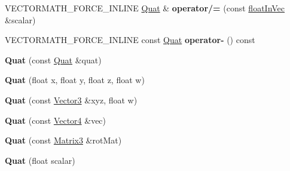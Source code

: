 \begin{DoxyCompactItemize}
\item 
\mbox{\label{classVectormath_1_1Aos_1_1Quat_aaafed68d1c51db881ed54fa3ac349767}} 
V\+E\+C\+T\+O\+R\+M\+A\+T\+H\+\_\+\+F\+O\+R\+C\+E\+\_\+\+I\+N\+L\+I\+NE \hyperlink{classVectormath_1_1Aos_1_1Quat}{Quat} \& {\bfseries operator/=} (const \hyperlink{classVectormath_1_1floatInVec}{float\+In\+Vec} \&scalar)
\item 
\mbox{\label{classVectormath_1_1Aos_1_1Quat_a6fd9ec8cbfe3cb15d6139da9b5dd1913}} 
V\+E\+C\+T\+O\+R\+M\+A\+T\+H\+\_\+\+F\+O\+R\+C\+E\+\_\+\+I\+N\+L\+I\+NE const \hyperlink{classVectormath_1_1Aos_1_1Quat}{Quat} {\bfseries operator-\/} () const
\item 
\mbox{\label{classVectormath_1_1Aos_1_1Quat_a9dcf3e36798a1d72e898dce8d0693858}} 
{\bfseries Quat} (const \hyperlink{classVectormath_1_1Aos_1_1Quat}{Quat} \&quat)
\item 
\mbox{\label{classVectormath_1_1Aos_1_1Quat_af6d1f2dbba730b5dd155c24400873161}} 
{\bfseries Quat} (float x, float y, float z, float w)
\item 
\mbox{\label{classVectormath_1_1Aos_1_1Quat_a3c4ef0ffb3cc139c06340426d90e84b5}} 
{\bfseries Quat} (const \hyperlink{classVectormath_1_1Aos_1_1Vector3}{Vector3} \&xyz, float w)
\item 
\mbox{\label{classVectormath_1_1Aos_1_1Quat_af61eecf13838a8cb72b0c694beae971b}} 
{\bfseries Quat} (const \hyperlink{classVectormath_1_1Aos_1_1Vector4}{Vector4} \&vec)
\item 
\mbox{\label{classVectormath_1_1Aos_1_1Quat_a9df4aeb15a7af04f4ba446059a099a71}} 
{\bfseries Quat} (const \hyperlink{classVectormath_1_1Aos_1_1Matrix3}{Matrix3} \&rot\+Mat)
\item 
\mbox{\label{classVectormath_1_1Aos_1_1Quat_a5cc6e6d27580904b9cc4d023134763e2}} 
{\bfseries Quat} (float scalar)
\item 
\mbox{\label{classVectormath_1_1Aos_1_1Quat_a499fcfece13998365dbf96f08e4aea9b}} 

\end{DoxyCompactItemize}
